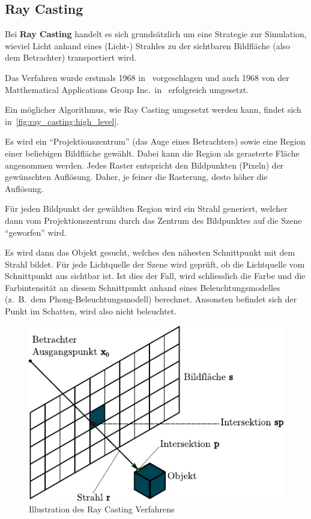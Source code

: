 \subsection{Ray Casting}
\label{subsec:ray_casting}


Bei \textbf{Ray Casting} handelt es sich grundsätzlich um eine Strategie zur
Simulation, wieviel Licht anhand eines (Licht-) Strahles zu der sichtbaren
Bildfläche (also dem Betrachter) transportiert wird.

Das Verfahren wurde erstmals 1968 in~\cite{appel_techniques_1968}
vorgeschlagen und auch 1968 von der Matthematical Applications Group
Inc.\ in~\cite{arlington_mathematical_applications_group_inc_afips_1968}
erfolgreich umgesetzt.

Ein möglicher Algorithmus, wie Ray Casting umgesetzt werden kann, findet
sich in~\ref{fig:ray_casting:high_level}.

Es wird ein ``Projektionszentrum'' (das Auge eines Betrachters) sowie
eine Region einer beliebigen Bildfläche gewählt. Dabei kann die Region
als gerasterte Fläche angenommen werden. Jedes Raster entspricht den
Bildpunkten (Pixeln) der gewünschten Auflösung.  Daher, je feiner die
Rasterung, desto höher die Auflösung.

Für jeden Bildpunkt der gewählten Region wird ein Strahl
generiert, welcher dann vom Projektionszentrum durch das Zentrum des
Bildpunktes auf die Szene ``geworfen'' wird. 

Es wird dann das Objekt gesucht, welches den nähesten Schnittpunkt mit
dem Strahl bildet. Für jede Lichtquelle der Szene wird geprüft, ob die
Lichtquelle vom Schnittpunkt aus sichtbar ist. Ist dies der Fall, wird
schliesslich die Farbe und die Farbintensität an diesem Schnittpunkt
anhand eines Beleuchtungsmodelles (z.\ B.\ dem Phong-Beleuchtungsmodell)
berechnet. Ansonsten befindet sich der Punkt im Schatten, wird also
nicht beleuchtet.

\begin{figure}[H]\label{fig:ray_casting_illustration}
    \centering
    \includegraphics{img/ray_casting.pdf}
    \caption{Illustration des Ray Casting Verfahrens\protect\footnotemark}
\end{figure}

